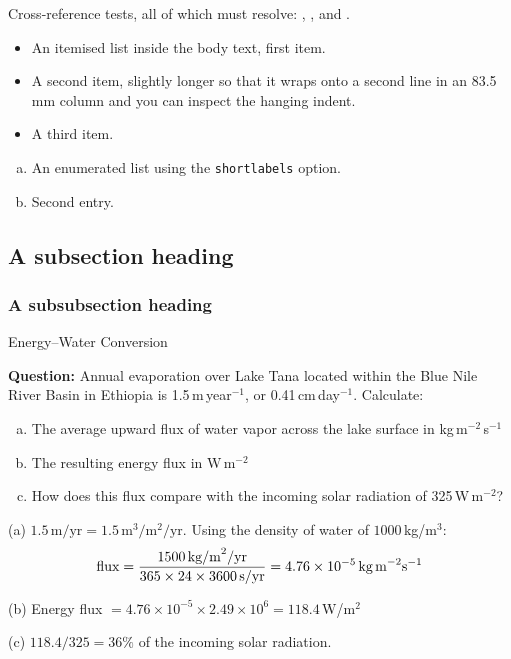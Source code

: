 Cross-reference tests, all of which must resolve:
, ,  and
.

\begin{itemize}
\item An itemised list inside the body text, first item.
\item A second item, slightly longer so that it wraps onto a second line in
      an 83.5\,mm column and you can inspect the hanging indent.
\item A third item.
\end{itemize}

\begin{enumerate}[(a)]
\item An enumerated list using the \texttt{shortlabels} option.
\item Second entry.
\end{enumerate}

\lipsum[18]

\subsection{A subsection heading}

\lipsum[19]

\subsubsection{A subsubsection heading}

\lipsum[20-23]

\begin{workedexample}{Energy--Water Conversion}
\label{wex:0.1}

\textbf{Question:} Annual evaporation over Lake Tana located within the Blue Nile River Basin in Ethiopia is 1.5\,m\,year$^{-1}$, or 0.41\,cm\,day$^{-1}$. Calculate:
\begin{enumerate}[(a)]
\item The average upward flux of water vapor across the lake surface in kg\,m$^{-2}$\,s$^{-1}$
\item The resulting energy flux in W\,m$^{-2}$
\item How does this flux compare with the incoming solar radiation of 325\,W\,m$^{-2}$?
\end{enumerate}


(a) $1.5\,\text{m/yr} = 1.5\,\text{m}^3/\text{m}^2/\text{yr}$. Using the density of water of $1000$\,kg/m$^3$:
\[
  \text{flux} = \frac{1500\,\text{kg/m}^2/\text{yr}}{365 \times 24 \times 3600\,\text{s/yr}}
  = 4.76 \times 10^{-5}\,\text{kg\,m}^{-2}\text{s}^{-1}
\]

(b) Energy flux $= 4.76 \times 10^{-5} \times 2.49 \times 10^6 = 118.4$\,W/m$^2$

(c) $118.4 / 325 = 36\%$ of the incoming solar radiation.
\end{workedexample}

